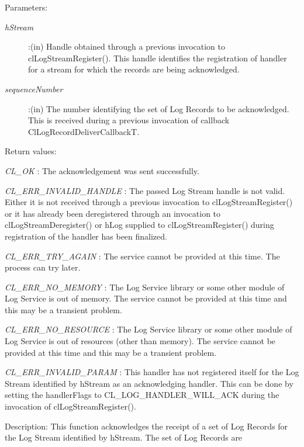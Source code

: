 \begin{flushleft}
\begin{Desc}
\begin{verbatim}
\end{verbatim}
\normalsize
\end{Desc}
\begin{Desc}
\item[Parameters:] 
\begin{description}
\item[{\em hStream}]:(in) Handle obtained through a previous invocation to clLogStreamRegister(). This handle identifies the registration of handler 
for a stream for which the records are being acknowledged.
\item[{\em sequenceNumber}]:(in) The number identifying the set of Log Records to be acknowledged. This is received during a previous invocation of
callback ClLogRecordDeliverCallbackT.
\end{description}
\end{Desc}
\begin{Desc}
\item[Return values:]
\item[{\em CL\_\-OK}]: The acknowledgement was sent successfully.
\item[{\em CL\_\-ERR\_\-INVALID\_\-HANDLE}]: The passed Log Stream handle is not valid. Either it is not received through a previous invocation to
clLogStreamRegister() or it has already been deregistered through an invocation to clLogStreamDeregister() or hLog supplied to clLogStreamRegister() 
during registration of the handler has been finalized.
\item[{\em CL\_\-ERR\_\-TRY\_\-AGAIN}]: The service cannot be provided at this time. The process can try later.
\item[{\em CL\_\-ERR\_\-NO\_\-MEMORY}]: The Log Service library or some other module of Log Service is out of memory. The service cannot 
be provided at this time and this may be a transient problem.
\item[{\em CL\_\-ERR\_\-NO\_\-RESOURCE}]: The Log Service library or some other module of Log Service is out of resources 
(other than memory). The service cannot be provided at this time and this may be a transient problem.
\item[{\em CL\_\-ERR\_\-INVALID\_\-PARAM}]: This handler has not registered itself for the Log Stream identified by hStream as an acknowledging handler.
This can be done by setting the handlerFlags to CL\_\-LOG\_\-HANDLER\_\-WILL\_\-ACK during the invocation of clLogStreamRegister().
\end{Desc}
\begin{Desc}
\item[Description:] This function acknowledges the receipt of a set of Log Records for the Log Stream identified by hStream. The set of Log Records are 

\end{Desc}
\end{flushleft}

